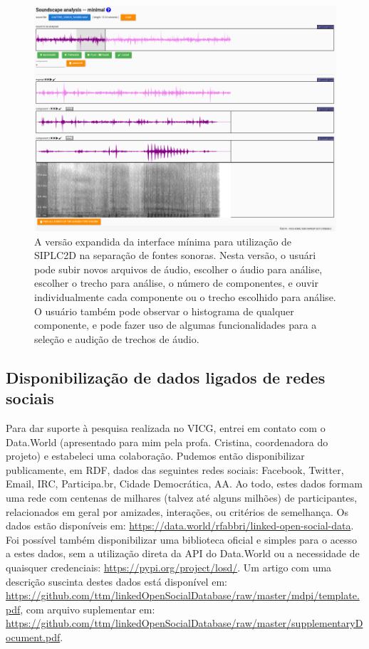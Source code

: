 \documentclass[a4paper, 11pt]{article}
\begin{document}
\begin{figure}[h!]
\centering
  \includegraphics[width=0.8\linewidth]{ss}
\caption{%
  A versão expandida da interface mínima para utilização de SIPLC2D na separação de fontes sonoras.
  Nesta versão, o usuári pode subir novos arquivos de áudio, escolher o áudio para análise,
  escolher o trecho para análise, o número de componentes, e ouvir individualmente cada componente
  ou o trecho escolhido para análise.
  O usuário também pode observar o histograma de qualquer componente, e pode fazer uso de algumas
  funcionalidades para a seleção e audição de trechos de áudio.
}\label{ss}
\end{figure}

\subsection{Disponibilização de dados ligados de redes sociais}
Para dar suporte à pesquisa realizada no VICG, entrei em contato com o
Data.World (apresentado para mim pela profa. Cristina, coordenadora do projeto)
e estabeleci uma colaboração.
Pudemos então disponibilizar publicamente, em RDF, dados das seguintes redes sociais:
Facebook, Twitter, Email, IRC, Participa.br, Cidade Democrática, AA.
Ao todo, estes dados formam uma rede com centenas de milhares (talvez até alguns milhões)
de participantes, relacionados em geral por amizades, interações, ou critérios de semelhança.
Os dados estão disponíveis em:
\url{https://data.world/rfabbri/linked-open-social-data}.
Foi possível também disponibilizar uma biblioteca oficial e simples para o acesso a estes dados,
sem a utilização direta da API do Data.World ou a necessidade de quaisquer credenciais:
\url{https://pypi.org/project/losd/}.
Um artigo com uma descrição suscinta destes dados está disponível em:
\url{https://github.com/ttm/linkedOpenSocialDatabase/raw/master/mdpi/template.pdf},
com arquivo suplementar em:
\url{https://github.com/ttm/linkedOpenSocialDatabase/raw/master/supplementaryDocument.pdf}.
\end{document}
